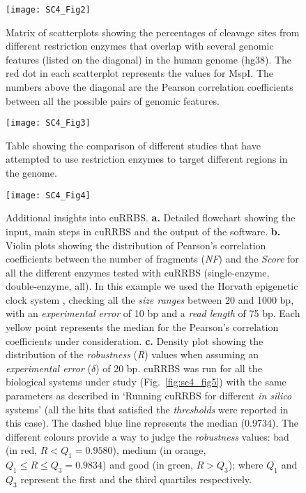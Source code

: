 \begin{figure}[htbp!] 
	\centering    
	\texttt{[image: SC4\_Fig2]}
	\caption[Genomic features that overlap with restriction enzyme cleavage sites]{Matrix of scatterplots showing the percentages of cleavage sites from different restriction enzymes that overlap with several genomic features (listed on the diagonal) in the human genome (hg38). The red dot in each scatterplot represents the values for MspI. The numbers above the diagonal are the Pearson correlation coefficients between all the possible pairs of genomic features.}
	\label{fig:sc4_fig2}
\end{figure}

\begin{figure}[htbp!] 
	\centering    
	\texttt{[image: SC4\_Fig3]}
	\caption[Comparison of studies using restriction enzymes for genomic enrichment]{Table showing the comparison of different studies that have attempted to use restriction enzymes to target different regions in the genome.}
	\label{fig:sc4_fig3}
\end{figure}

\begin{figure}[htbp!] 
	\centering    
	\texttt{[image: SC4\_Fig4]}
	\vspace*{1mm}
	\caption[Additional insights into cuRRBS]{Additional insights into cuRRBS. \textbf{a.} Detailed flowchart showing the input, main steps in cuRRBS and the output of the software. \textbf{b.} Violin plots showing the distribution of Pearson's correlation coefficients between the number of fragments (\textit{NF}) and the \textit{Score} for all the different enzymes tested with cuRRBS (single-enzyme, double-enzyme, all). In this example we used the Horvath epigenetic clock system \cite{Horvath2013}, checking all the \textit{size ranges} between 20 and 1000 bp, with an \textit{experimental error} of 10 bp and a \textit{read length} of 75 bp. Each yellow point represents the median for the Pearson's correlation coefficients under consideration. \textbf{c.} Density plot showing the distribution of the \textit{robustness} (\textit{R}) values when assuming an \textit{experimental error} ($\delta$) of 20 bp. cuRRBS was run for all the biological systems under study (Fig.~\ref{fig:sc4_fig5}) \cite{Horvath2013,Hanna2016,Milagre2017,Kawakatsu2016,Maurano2015,LevMaor2015,Domcke2015} with the same parameters as described in `Running cuRRBS for different \textit{in silico} systems' (all the hits that satisfied the \textit{thresholds} were reported in this case). The dashed blue line represents the median (0.9734). The different colours provide a way to judge the \textit{robustness} values: bad (in red, $R < Q_1 = 0.9580$), medium (in orange, $Q_1 \leq R \leq Q_3 = 0.9834$) and good (in green, $R > Q_3$); where $Q_1$ and $Q_3$ represent the first and the third quartiles respectively.}
	\label{fig:sc4_fig4}
\end{figure}

